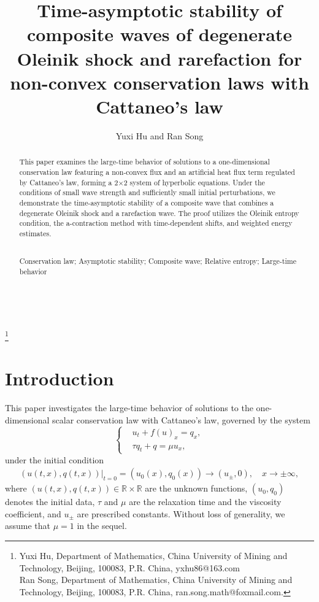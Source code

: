 \documentclass[10pt,reqno]{amsart}
\numberwithin{equation}{section}
\begin{document}
{\tiny }
	\title[Stability of conservation law]{Time-asymptotic stability of composite waves of degenerate Oleinik shock and rarefaction for non-convex conservation laws with Cattaneo's law}
	\author{Yuxi Hu and Ran Song}
	\thanks{\noindent Yuxi Hu, Department of Mathematics, China University of Mining and Technology, Beijing, 100083, P.R. China,
		yxhu86@163.com\\
		\indent Ran Song, Department of Mathematics, China University of Mining and Technology, Beijing, 100083, P.R. China, 
		ran.song.math@foxmail.com.
	}
	\date{}
	\maketitle
	\renewcommand{\abstractname}{\textbf{Abstract}}
	\begin{abstract}
		This paper examines the large-time behavior of solutions to a one-dimensional conservation law featuring a non-convex flux and an artificial heat flux term regulated by Cattaneo's law, forming a 2$\times$2 system of hyperbolic equations. Under the conditions of small wave strength and sufficiently small initial perturbations, we demonstrate the time-asymptotic stability of a composite wave that combines a degenerate Oleinik shock and a rarefaction wave. The proof utilizes the Oleinik entropy condition, the a-contraction method with time-dependent shifts, and weighted energy estimates.\par
		\ \\
		 Conservation law; Asymptotic stability; Composite wave; Relative entropy; Large-time behavior\par
		\ \\
	\end{abstract}
	
	
	\section{Introduction}
	This paper investigates the large-time behavior of solutions to the one-dimensional scalar conservation law with Cattaneo's law, governed by the system \cite{ref29,ref5,ref7}
	\begin{equation}\label{yfc}
		\left\{
			\begin{aligned}
				&u_t+f(u)_x=q_{x},\\
				&\tau q_{t}+q=\mu u_{x},
			\end{aligned}\right.
		\end{equation}
		under the initial condition
		\begin{align}\label{IC}
			\left(u(t,x),q(t,x)\right)|_{t=0}=(u_{0}(x),q_{0}(x))\to(u_{\pm},0),\quad x\to \pm \infty,
		\end{align}
		where $(u(t,x),q(t,x))\in\mathbb{R}\times \mathbb{R}$ are the unknown functions, $(u_0,q_0)$ denotes the initial data, $\tau$ and $\mu$ are the relaxation time and the viscosity coefficient, and $u_{\pm}$ are prescribed constants. Without loss of generality, we assume that $\mu=1$ in the sequel.
		
\end{document}
